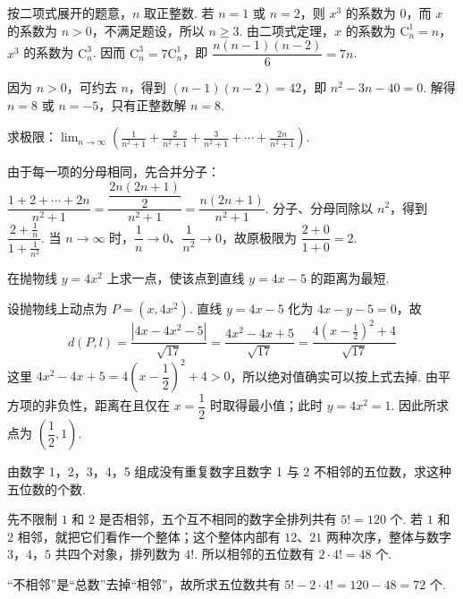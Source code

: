 \begin{solution}
按二项式展开的题意，\(n\) 取正整数. 若 \(n=1\) 或 \(n=2\)，则 \(x^3\) 的系数为 \(0\)，而 \(x\) 的系数为 \(n>0\)，不满足题设，所以 \(n\geqslant3\). 由二项式定理，\(x\) 的系数为 \(\mathrm C_n^1=n\)，\(x^3\) 的系数为 \(\mathrm C_n^3\). 因而
\(\mathrm C_n^3=7\mathrm C_n^1\)，即 \(\dfrac{n(n-1)(n-2)}{6}=7n\).

因为 \(n>0\)，可约去 \(n\)，得到 \((n-1)(n-2)=42\)，即 \(n^2-3n-40=0\). 解得 \(n=8\) 或 \(n=-5\)，只有正整数解 \(n=8\).
\end{solution}

\begin{problem}

求极限：\(\displaystyle\lim_{n \to \infty}\left(\frac{1}{n^2 + 1} + \frac{2}{n^2 + 1} + \frac{3}{n^2 + 1} + \cdots + \frac{2n}{n^2 + 1}\right)\).
\end{problem}

\begin{solution}
由于每一项的分母相同，先合并分子：
\(\dfrac{1+2+\cdots+2n}{n^2+1}=\dfrac{\dfrac{2n(2n+1)}{2}}{n^2+1}=\dfrac{n(2n+1)}{n^2+1}\). 分子、分母同除以 \(n^2\)，得到
\(\dfrac{2+\frac1n}{1+\frac1{n^2}}\). 当 \(n\to\infty\) 时，\(\dfrac1n\to0\)、\(\dfrac1{n^2}\to0\)，故原极限为
\(\dfrac{2+0}{1+0}=2\).
\end{solution}

\begin{problem}

在抛物线 \(y = 4x^2\) 上求一点，使该点到直线 \(y = 4x - 5\) 的距离为最短.
\end{problem}

\begin{solution}
设抛物线上动点为 \(P=(x,4x^2)\). 直线 \(y=4x-5\) 化为 \(4x-y-5=0\)，故
\[
d(P,l)=\frac{|4x-4x^2-5|}{\sqrt{17}}
=\frac{4x^2-4x+5}{\sqrt{17}}
=\frac{4\left(x-\frac12\right)^2+4}{\sqrt{17}}
\]
这里 \(4x^2-4x+5=4\left(x-\dfrac12\right)^2+4>0\)，所以绝对值确实可以按上式去掉. 由平方项的非负性，距离在且仅在 \(x=\dfrac12\) 时取得最小值；此时 \(y=4x^2=1\). 因此所求点为 \(\left(\dfrac12,1\right)\).
\end{solution}

\begin{problem}

由数字 1，2，3，4，5 组成没有重复数字且数字 1 与 2 不相邻的五位数，求这种五位数的个数.
\end{problem}

\begin{solution}
先不限制 \(1\) 和 \(2\) 是否相邻，五个互不相同的数字全排列共有 \(5!=120\) 个. 若 \(1\) 和 \(2\) 相邻，就把它们看作一个整体；这个整体内部有 \(12\)、\(21\) 两种次序，整体与数字 \(3\)，\(4\)，\(5\) 共四个对象，排列数为 \(4!\). 所以相邻的五位数有 \(2\cdot4!=48\) 个.

“不相邻”是“总数”去掉“相邻”，故所求五位数共有 \(5!-2\cdot4!=120-48=72\) 个.
\end{solution}

